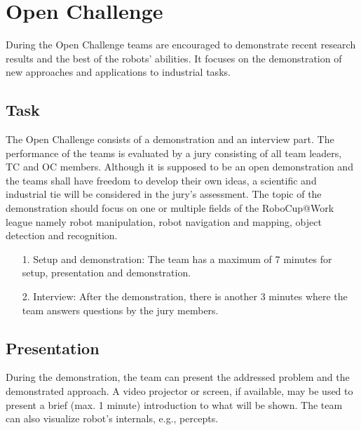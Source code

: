

\newpage
\section{Open Challenge}
During the Open Challenge teams are encouraged to demonstrate recent research results and the best of the robots’ abilities. It focuses on the demonstration of new approaches and applications to industrial tasks.

\subsection{Task}

The Open Challenge consists of a demonstration and an interview part. The performance of the teams is evaluated by a jury consisting of all team leaders, TC and OC members. Although it is supposed to be an open demonstration and the teams shall have freedom to develop their own ideas, a scientific and industrial tie will be considered in the jury's assessment. The topic of the demonstration should focus on one or multiple fields of the RoboCup@Work league namely robot manipulation, robot navigation and mapping, object detection and recognition.

\begin{itemize}
\item[1.] Setup and demonstration: The team has a maximum of 7 minutes for setup, presentation and demonstration.
\item[2.] Interview: After the demonstration, there is another 3 minutes where the team answers questions by the jury members.
\end{itemize}

\subsection{Presentation}
During the demonstration, the team can present the addressed problem and the demonstrated approach.
A video projector or screen, if available, may be used to present a brief (max. 1 minute) introduction to what will be shown. The team can also visualize robot’s internals, e.g., percepts.

